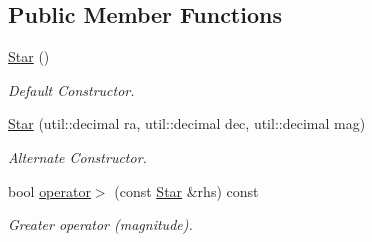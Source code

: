 \subsection*{Public Member Functions}
\begin{DoxyCompactItemize}
\item 
\mbox{\label{classstar__tracker_1_1Star_a5537e9df68881b2fdcb560af95f045a5}} 
\hyperlink{classstar__tracker_1_1Star_a5537e9df68881b2fdcb560af95f045a5}{Star} ()
\begin{DoxyCompactList}\small\item\em Default Constructor. \end{DoxyCompactList}\item 
\hyperlink{classstar__tracker_1_1Star_a371887a36edc9ede4cf3a1ce34d6a9a0}{Star} (util\+::decimal ra, util\+::decimal dec, util\+::decimal mag)
\begin{DoxyCompactList}\small\item\em Alternate Constructor. \end{DoxyCompactList}\item 
bool \hyperlink{classstar__tracker_1_1Star_af003828866e5fd1b789a3b46dfceb1b5}{operator$>$} (const \hyperlink{classstar__tracker_1_1Star}{Star} \&rhs) const
\begin{DoxyCompactList}\small\item\em Greater operator (magnitude). \end{DoxyCompactList}\end{DoxyCompactItemize}
